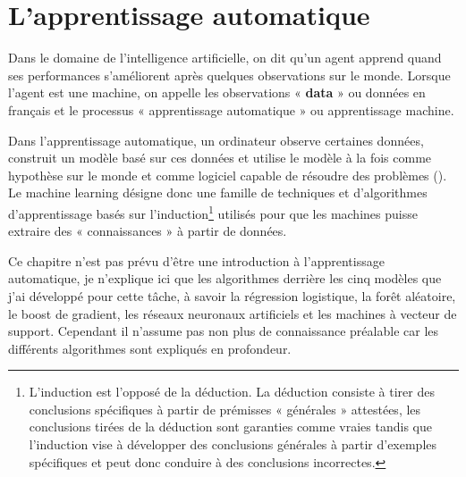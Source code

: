 \chapter{L’apprentissage automatique}
\label{chapter4}
Dans le domaine de l'intelligence artificielle, on dit qu'un agent apprend quand ses performances s’améliorent après quelques observations sur le monde. Lorsque l’agent est une machine, on appelle les observations « \textbf{data} » ou données en français et le processus « apprentissage automatique » ou apprentissage machine.

Dans l'apprentissage automatique, un ordinateur observe certaines données, construit un modèle basé sur ces données et utilise le modèle à la fois comme hypothèse sur le monde et comme logiciel capable de résoudre des problèmes (\cite{RussellNorvig2020}). Le machine learning désigne donc une famille de techniques et d’algorithmes d’apprentissage basés sur l’induction\footnote{L’induction est l’opposé de la déduction. La déduction consiste à tirer des conclusions spécifiques à partir de prémisses « générales » attestées, les conclusions tirées de la déduction sont garanties comme vraies tandis que l'induction vise à développer des conclusions générales à partir d'exemples spécifiques et peut donc conduire à des conclusions incorrectes.} utilisés pour que les machines puisse extraire des « connaissances » à partir de données.

Ce chapitre n'est pas prévu d'être une introduction à l'apprentissage automatique, je n'explique ici que les algorithmes derrière les cinq modèles que j'ai développé pour cette tâche, à savoir la régression logistique, la forêt aléatoire, le boost de gradient, les réseaux neuronaux artificiels et les machines à vecteur de support. Cependant il n'assume pas non plus de connaissance préalable car les différents algorithmes sont expliqués en profondeur. 











\clearpage